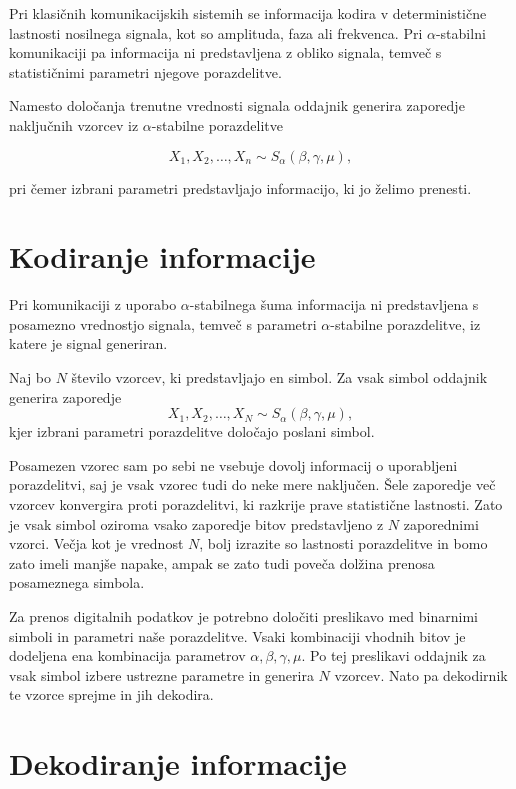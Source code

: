\documentclass[a4paper, 12pt, openany]{book}
\begin{document}
Pri klasičnih komunikacijskih sistemih se informacija kodira v deterministične lastnosti nosilnega signala, kot so amplituda, faza ali frekvenca. Pri $\alpha$-stabilni komunikaciji pa informacija ni predstavljena z obliko signala, temveč s statističnimi parametri njegove porazdelitve. 

Namesto določanja trenutne vrednosti signala oddajnik generira zaporedje naključnih vzorcev iz $\alpha$-stabilne porazdelitve

\[
X_1,X_2,\ldots,X_n
\sim
S_\alpha(\beta,\gamma,\mu),
\]

pri čemer izbrani parametri predstavljajo informacijo, ki jo želimo prenesti.

\section{Kodiranje informacije}

Pri komunikaciji z uporabo $\alpha$-stabilnega šuma informacija ni predstavljena s posamezno vrednostjo signala, temveč s parametri $\alpha$-stabilne porazdelitve, iz katere je signal generiran. 

\begin{tcolorbox}[colback=blue!5!white,colframe=blue!50!black, title=Definicija 7: Teoretično delovanje oddajnika]
Naj bo $N$ število vzorcev, ki predstavljajo en simbol. Za vsak simbol oddajnik generira zaporedje
\[
X_1,X_2,\dots,X_N
\sim
S_\alpha(\beta, \gamma,\mu),
\]
kjer izbrani parametri porazdelitve določajo poslani simbol.
\end{tcolorbox}

Posamezen vzorec sam po sebi ne vsebuje dovolj informacij o uporabljeni porazdelitvi, saj je vsak vzorec tudi do neke mere naključen. Šele zaporedje več vzorcev konvergira proti porazdelitvi, ki razkrije prave statistične lastnosti. Zato je vsak simbol oziroma vsako zaporedje bitov predstavljeno z $N$ zaporednimi vzorci. Večja kot je vrednost $N$, bolj izrazite so lastnosti porazdelitve in bomo zato imeli manjše napake, ampak se zato tudi poveča dolžina prenosa posameznega simbola.

Za prenos digitalnih podatkov je potrebno določiti preslikavo med binarnimi simboli in parametri naše porazdelitve. Vsaki kombinaciji vhodnih bitov je dodeljena ena kombinacija parametrov $\alpha, \beta, \gamma, \mu$. Po tej preslikavi oddajnik za vsak simbol izbere ustrezne parametre in generira $N$ vzorcev. Nato pa dekodirnik te vzorce sprejme in jih dekodira.

\section{Dekodiranje informacije}
\end{document}
